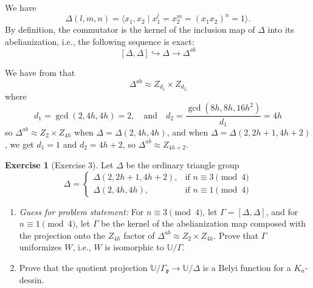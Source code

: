 \documentclass[reqno]{amsart}
\theoremstyle{definition}
\newtheorem{exercise}[theorem]{Exercise}
\theoremstyle{remark}
\begin{document}
We have 
    \[
    \Delta (l,m,n) =
    \langle x_1, x_2 \mid 
    x_1^l = x_2^m = (x_1 x_2)^{n} = 1
    \rangle.
    \]
    By definition, the commutator is
    the kernel of the inclusion map
    of $\Delta$ into its abelianization, i.e.,
    the following sequence is exact:
    \[
    \left[ \Delta, \Delta \right] \hookrightarrow
    \Delta \to \Delta^{ab}
    \]

    We have from \cite[p~105]{Albar-Al-Hamdan} that 
   \[
    \Delta^{ab}
    \approx Z_{d_1} \times Z_{d_2}\]
where
\[d_1 = \gcd(2,4h,4h) = 2, \quad
\text{and} \quad d_2 = \frac{\gcd(8h, 8h, 16h^2)}
{d_1}
= 4h\]
so $\Delta^{ab}
    \approx Z_2 \times Z_{4h}$ when
    $\Delta = \Delta (2,4h, 4h)$, and
    when $\Delta = \Delta (2,2h+1,4h+2)$, we
    get $d_1 = 1$ and $d_2 = 4h+2$, so
    $\Delta^{ab} \approx Z_{4h+2}$.

\begin{exercise}[Exercise 3]
    Let $\Delta$ be the ordinary triangle group
    \[ \Delta = 
    \begin{cases}
        \Delta (2, 2h+1, 4h+2),& \text{if } n \equiv 3 \pmod{4}\\
        \Delta (2,4h,4h),& \text{if } n\equiv 1  \pmod{4}
    \end{cases}
    \]
      \begin{enumerate}
        \item \textit{Guess for problem statement:} 
        For $n \equiv 3 \pmod{4}$,
    let $\Gamma = 
        \left[\Delta, \Delta \right]$, and for $n \equiv
        1 \pmod{4}$, let $\Gamma$ be the kernel of
        the abelianization map composed with the projection onto the $Z_{4h}$ factor of $\Delta^{ab} \approx Z_2 \times
        Z_{4h}$. Prove that $\Gamma$ uniformizes 
        $W$, i.e., $W$ is isomorphic to
        $\mathbb{U}/ \Gamma$.
        \item Prove that the quotient
        projection
        $\mathbb{U}/ \Gamma_{\mathfrak{p}} \to
        \mathbb{U}/ \Delta$ is a 
        Belyi function for a
        $K_n$-dessin.
    \end{enumerate}
\end{exercise}
\end{document}
